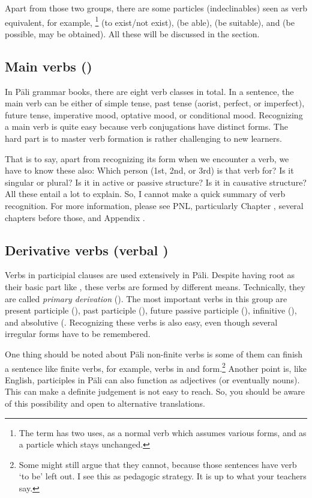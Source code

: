 Apart from those two groups, there are some particles (indeclinables) seen as verb equivalent, for example, \footnote{The term has two uses, as a normal verb which assumes various forms, and as a particle which stays unchanged.} (to exist/not exist),  (be able),  (be suitable), and  (be possible, may be obtained). All these will be discussed in the  section.

\subsection*{Main verbs ()}

In P\=ali grammar books, there are eight verb classes in total. In a sentence, the main verb can be either of simple tense, past tense (aorist, perfect, or imperfect), future tense, imperative mood, optative mood, or conditional mood. Recognizing a main verb is quite easy because verb conjugations have distinct forms. The hard part is to master verb formation is rather challenging to new learners.

That is to say, apart from recognizing its form when we encounter a verb, we have to know these also: Which person (1st, 2nd, or 3rd) is that verb for? Is it singular or plural? Is it in active or passive structure? Is it in causative structure? All these entail a lot to explain. So, I cannot make a quick summary of verb recognition. For more information, please see PNL, particularly Chapter , several chapters before those, and Appendix .

\subsection*{Derivative verbs (verbal )}

Verbs in participial clauses are used extensively in P\=ali. Despite having root as their basic part like , these verbs are formed by different means. Technically, they are called \emph{primary derivation} (). The most important verbs in this group are present participle (), past participle (), future passive participle (), infinitive \mbox{()}, and absolutive (. Recognizing these verbs is also easy, even though several irregular forms have to be remembered.

One thing should be noted about P\=ali non-finite verbs is some of them can finish a sentence like finite verbs, for example, verbs in  and  form.\footnote{Some might still argue that they cannot, because those sentences have verb `to be' left out. I see this as pedagogic strategy. It is up to what your teachers say.} Another point is, like English, participles in P\=ali can also function as adjectives (or eventually nouns). This can make a definite judgement is not easy to reach. So, you should be aware of this possibility and open to alternative translations.

